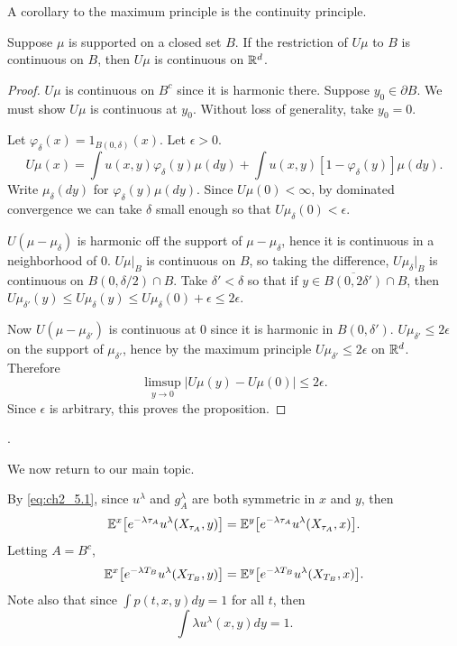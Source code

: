 
A corollary to the maximum principle is the continuity principle.

\begin{proposition}\label{prop:ch2_5.3}
Suppose $\mu$ is supported on a closed set $B$. If the restriction of $U\mu$ to $B$ is continuous on $B$, then $U\mu$ is continuous on $\mathbb{R}^d$.
\end{proposition}

\begin{proof}
$U\mu$ is continuous on $B^c$ since it is harmonic there. Suppose $y_0 \in \partial B$. We must show $U\mu$ is continuous at $y_0$. Without loss of generality, take $y_0 = 0$.

Let $\varphi_\delta(x) = 1_{B(0,\delta)}(x)$. Let $\epsilon > 0$.
\[
    U\mu(x) = \int u(x,y)\varphi_\delta(y)\mu(dy) + \int u(x,y)[1 - \varphi_\delta(y)]\mu(dy).
\]
Write $\mu_\delta(dy)$ for $\varphi_\delta(y)\mu(dy)$. Since $U\mu(0) < \infty$, by dominated convergence we can take $\delta$ small enough so that $U\mu_\delta(0) < \epsilon$.

$U(\mu - \mu_\delta)$ is harmonic off the support of $\mu - \mu_\delta$, hence it is continuous in a neighborhood of $0$. $U\mu|_B$ is continuous on $B$, so taking the difference, $U\mu_\delta|_B$ is continuous on $B(0,\delta/2) \cap B$. Take $\delta' < \delta$ so that if $y \in \overline{B(0,2\delta')} \cap B$, then $U\mu_{\delta'}(y) \leq U\mu_\delta(y) \leq U\mu_\delta(0) + \epsilon \leq 2\epsilon$.

Now $U(\mu - \mu_{\delta'})$ is continuous at $0$ since it is harmonic in $B(0,\delta')$. $U\mu_{\delta'} \leq 2\epsilon$ on the support of $\mu_{\delta'}$, hence by the maximum principle $U\mu_{\delta'} \leq 2\epsilon$
on $\mathbb{R}^d$. Therefore
\[
    \limsup_{y\to0} |U\mu(y) - U\mu(0)| \leq 2\epsilon.
\]
Since $\epsilon$ is arbitrary, this proves the proposition.
\end{proof}

.


We now return to our main topic.

By \eqref{eq:ch2_5.1}, since $u^\lambda$ and $g_A^\lambda$ are both symmetric in $x$ and $y$, then
\[
    \mathbb{E}^x\big[e^{-\lambda\tau_A}u^\lambda(X_{\tau_A}, y)\big] = \mathbb{E}^y\big[e^{-\lambda\tau_A}u^\lambda(X_{\tau_A}, x)\big].
\]
Letting $A = B^c$,
\begin{equation}\label{eq:ch2_5.2}
    \mathbb{E}^x\big[e^{-\lambda T_B}u^\lambda(X_{T_B}, y)\big] = \mathbb{E}^y\big[e^{-\lambda T_B}u^\lambda(X_{T_B}, x)\big].
\end{equation}
Note also that since $\int p(t,x,y)dy = 1$ for all $t$, then
\begin{equation}\label{eq:ch2_5.3}
    \int \lambda u^\lambda(x,y)dy = 1.
\end{equation}

